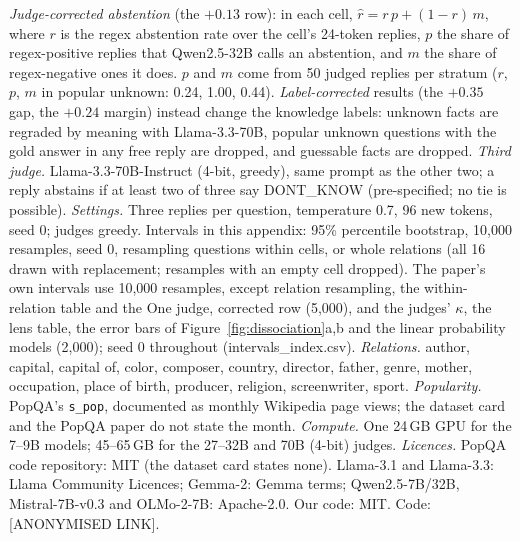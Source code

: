 \emph{Judge-corrected abstention} (the $+0.13$ row): in each cell, $\hat r = r\,p + (1-r)\,m$, where $r$ is the regex abstention rate over the cell's 24-token replies, $p$ the share of regex-positive replies that Qwen2.5-32B calls an abstention, and $m$ the share of regex-negative ones it does. $p$ and $m$ come from 50 judged replies per stratum ($r$, $p$, $m$ in popular unknown: 0.24, 1.00, 0.44). \emph{Label-corrected} results (the $+0.35$ gap, the $+0.24$ margin) instead change the knowledge labels: unknown facts are regraded by meaning with Llama-3.3-70B, popular unknown questions with the gold answer in any free reply are dropped, and guessable facts are dropped.
\emph{Third judge.} Llama-3.3-70B-Instruct (4-bit, greedy), same prompt as the other two; a reply abstains if at least two of three say DONT\_KNOW (pre-specified; no tie is possible).
\emph{Settings.} Three replies per question, temperature 0.7, 96 new tokens, seed 0; judges greedy. Intervals in this appendix: 95\% percentile bootstrap, 10,000 resamples, seed 0, resampling questions within cells, or whole relations (all 16 drawn with replacement; resamples with an empty cell dropped). The paper's own intervals use 10,000 resamples, except relation resampling, the within-relation table and the One judge, corrected row (5,000), and the judges' $\kappa$, the lens table, the error bars of Figure~\ref{fig:dissociation}a,b and the linear probability models (2,000); seed 0 throughout (intervals\_index.csv).
\emph{Relations.} author, capital, capital of, color, composer, country, director, father, genre, mother, occupation, place of birth, producer, religion, screenwriter, sport.
\emph{Popularity.} PopQA's \texttt{s\_pop}, documented as monthly Wikipedia page views; the dataset card and the PopQA paper do not state the month.
\emph{Compute.} One 24\,GB GPU for the 7--9B models; 45--65\,GB for the 27--32B and 70B (4-bit) judges.
\emph{Licences.} PopQA code repository: MIT (the dataset card states none). Llama-3.1 and Llama-3.3: Llama Community Licences; Gemma-2: Gemma terms; Qwen2.5-7B/32B, Mistral-7B-v0.3 and OLMo-2-7B: Apache-2.0. Our code: MIT. Code: [ANONYMISED LINK].

